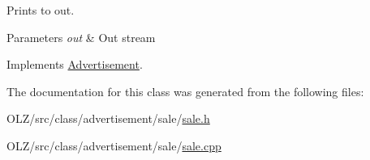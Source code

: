 Prints to out. 


\begin{DoxyParams}{Parameters}
{\em out} & Out stream \\
\hline
\end{DoxyParams}


Implements \hyperlink{class_advertisement_adb38cc00b914dd7a0509829c220eb2bc}{Advertisement}.



The documentation for this class was generated from the following files\+:\begin{DoxyCompactItemize}
\item 
O\+L\+Z/src/class/advertisement/sale/\hyperlink{sale_8h}{sale.\+h}\item 
O\+L\+Z/src/class/advertisement/sale/\hyperlink{sale_8cpp}{sale.\+cpp}\end{DoxyCompactItemize}
